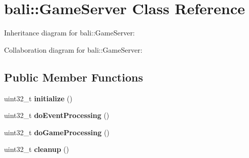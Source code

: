 \hypertarget{classbali_1_1_game_server}{\section{bali\-:\-:Game\-Server Class Reference}
\label{classbali_1_1_game_server}
}


Inheritance diagram for bali\-:\-:Game\-Server\-:


Collaboration diagram for bali\-:\-:Game\-Server\-:
\subsection*{Public Member Functions}
\begin{DoxyCompactItemize}
\item 
\hypertarget{classbali_1_1_game_server_a3440dbc748f9d10dddea157e177b91a0}{uint32\-\_\-t {\bfseries initialize} ()}\label{classbali_1_1_game_server_a3440dbc748f9d10dddea157e177b91a0}

\item 
\hypertarget{classbali_1_1_game_server_adf7c045119090c2f61161afbbbf31025}{uint32\-\_\-t {\bfseries do\-Event\-Processing} ()}\label{classbali_1_1_game_server_adf7c045119090c2f61161afbbbf31025}

\item 
\hypertarget{classbali_1_1_game_server_a1b891e01fa6fe726d86867b474e6da6c}{uint32\-\_\-t {\bfseries do\-Game\-Processing} ()}\label{classbali_1_1_game_server_a1b891e01fa6fe726d86867b474e6da6c}

\item 
\hypertarget{classbali_1_1_game_server_ab669f0c8f90e4b1ac551c7cf006ed424}{uint32\-\_\-t {\bfseries cleanup} ()}\label{classbali_1_1_game_server_ab669f0c8f90e4b1ac551c7cf006ed424}

\end{DoxyCompactItemize}
